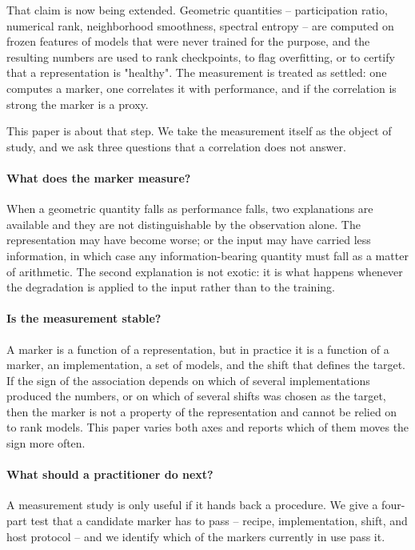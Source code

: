 \documentclass[10pt]{article}
\begin{document}
That claim is now being extended. Geometric quantities -- participation ratio,
numerical rank, neighborhood smoothness, spectral entropy -- are computed on
frozen features of models that were never trained for the purpose, and the
resulting numbers are used to rank checkpoints, to flag overfitting, or to
certify that a representation is "healthy". The measurement is treated as
settled: one computes a marker, one correlates it with performance, and if the
correlation is strong the marker is a proxy.

This paper is about that step. We take the measurement itself as the object of
study, and we ask three questions that a correlation does not answer.

\paragraph{What does the marker measure?}
When a geometric quantity falls as performance falls, two explanations are
available and they are not distinguishable by the observation alone. The
representation may have become worse; or the input may have carried less
information, in which case any information-bearing quantity must fall as a
matter of arithmetic. The second explanation is not exotic: it is what happens
whenever the degradation is applied to the input rather than to the training.

\paragraph{Is the measurement stable?}
A marker is a function of a representation, but in practice it is a function of
a marker, an implementation, a set of models, and the shift that defines the
target. If the sign of the association depends on which of several
implementations produced the numbers, or on which of several shifts was chosen
as the target, then the marker is not a property of the representation and
cannot be relied on to rank models. This paper varies both axes and reports
which of them moves the sign more often.

\paragraph{What should a practitioner do next?}
A measurement study is only useful if it hands back a procedure. We give a
four-part test that a candidate marker has to pass -- recipe, implementation,
shift, and host protocol -- and we identify which of the
markers currently in use pass it.
\end{document}
